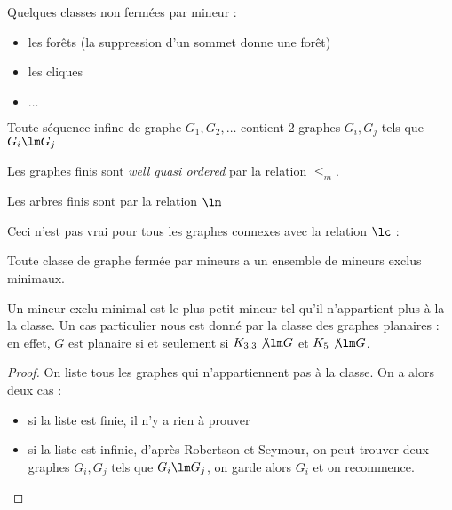 \documentclass[a4paper, 11pt]{thesis}
\begin{document}
Quelques classes non fermées par mineur :
\begin{itemize}
    \item les forêts (la suppression d'un sommet donne une forêt)
    \item les cliques
    \item $\dots$
\end{itemize}

\begin{df}
    Toute séquence infine de graphe $G_1, G_2, \dots$ contient 2 graphes $G_i, G_j$ tels que $G_i
    \lm G_j$
\end{df}

\begin{thrm}
    Les graphes finis sont \emph{well quasi ordered} par la relation $\leq_m$.
\end{thrm}

\begin{thrm}[Kruskal, 1960]
    Les arbres finis sont \wqo par la relation $\lm$
\end{thrm}

Ceci n'est pas vrai pour tous les graphes connexes avec la relation $\lc$ :

\begin{corol}
    Toute classe de graphe fermée par mineurs a un ensemble  de mineurs exclus minimaux.
\end{corol}

Un mineur exclu minimal est le plus petit mineur tel qu'il n'appartient plus à la la classe.
Un cas particulier nous est donné par la classe des graphes planaires : en effet, $G$ est planaire
si et seulement si $K_{3,3} \not \lm G$ et $K_5 \not \lm G$.

\begin{proof}
    On liste tous les graphes qui n'appartiennent pas à la classe. On a alors deux cas :
    \begin{itemize}
        \item si la liste est finie, il n'y a rien à prouver
        \item si la liste est infinie, d'après Robertson et Seymour, on peut trouver deux graphes
            $G_i, G_j$ tels que $G_i \lm G_j$, on garde alors $G_i$ et on recommence.
    \end{itemize}
\end{proof}
\end{document}
